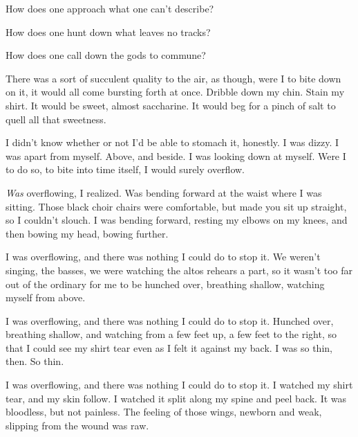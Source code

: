 
\null
\vfill
{}
\vfill
\newpage

\noindent How does one approach what one can't describe?


\noindent How does one hunt down what leaves no tracks?


\noindent How does one call down the gods to commune?

\newpage

\null
\vspace{1cm}
\noindent There was a sort of succulent quality to the air, as though, were I to bite down on it, it would all come bursting forth at once. Dribble down my chin. Stain my shirt. It would be sweet, almost saccharine. It would beg for a pinch of salt to quell all that sweetness.

I didn't know whether or not I'd be able to stomach it, honestly. I was dizzy. I was apart from myself. Above, and beside. I was looking down at myself. Were I to do so, to bite into time itself, I would surely overflow.

\emph{Was} overflowing, I realized. Was bending forward at the waist where I was sitting. Those black choir chairs were comfortable, but made you sit up straight, so I couldn't slouch. I was bending forward, resting my elbows on my knees, and then bowing my head, bowing further.

I was overflowing, and there was nothing I could do to stop it. We weren't singing, the basses, we were watching the altos rehears a part, so it wasn't too far out of the ordinary for me to be hunched over, breathing shallow, watching myself from above.

I was overflowing, and there was nothing I could do to stop it. Hunched over, breathing shallow, and watching from a few feet up, a few feet to the right, so that I could see my shirt tear even as I felt it against my back. I was so thin, then. So thin.

I was overflowing, and there was nothing I could do to stop it. I watched my shirt tear, and my skin follow. I watched it split along my spine and peel back. It was bloodless, but not painless. The feeling of those wings, newborn and weak, slipping from the wound was raw.

